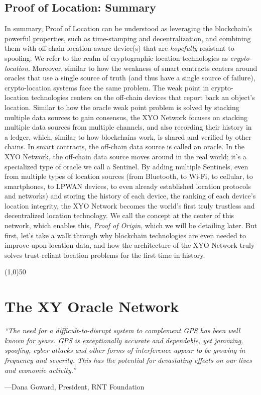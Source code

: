 \documentclass{article}
\begin{document}
\subsection {Proof of Location: Summary}
In summary, Proof of Location can be understood as leveraging the blockchain's powerful properties, such as time-stamping and decentralization, and combining them with off-chain location-aware device(s) that are \textit{hopefully} resistant to spoofing. We refer to the realm of cryptographic location technologies as \textit{crypto-location}. Moreover, similar to how the weakness of smart contracts centers around oracles that use a single source of truth (and thus have a single source of failure), crypto-location systems face the same problem. The weak point in crypto-location technologies centers on the off-chain devices that report back an object's location. Similar to how the oracle weak point problem is solved by stacking multiple data sources to gain consensus, the XYO Network focuses on stacking multiple data sources from multiple channels, and also recording their history in a ledger, which, similar to how blockchains work, is shared and verified by other chains. In smart contracts, the off-chain data source is called an oracle. In the XYO Network, the off-chain data source moves around in the real world; it's a specialized type of oracle we call a Sentinel. By adding multiple Sentinels, even from multiple types of location sources (from Bluetooth, to Wi-Fi, to cellular, to smartphones, to LPWAN devices, to even already established location protocols and networks) and storing the history of each device, the ranking of each device's location integrity, the XYO Network becomes the world's first truly trustless and decentralized location technology. We call the concept at the center of this network, which enables this, \textit{Proof of Origin}, which we will be detailing later. But first, let's take a walk through why blockchain technologies are even needed to improve upon location data, and how the architecture of the XYO Network truly solves trust-reliant location problems for the first time in history.
\begin{center}
\line(1,0){50}
\end{center}


\section {The XY Oracle Network}

\begin{displayquote}\textit{``The need for a difficult-to-disrupt system to complement GPS has been well known for years. GPS is exceptionally accurate and dependable, yet jamming, spoofing, cyber attacks and other forms of interference appear to be growing in frequency and severity. This has the potential for devastating effects on our lives and economic activity.''}

\vspace{2mm}
---Dana Goward, President, RNT Foundation
\end{displayquote}
\end{document}
